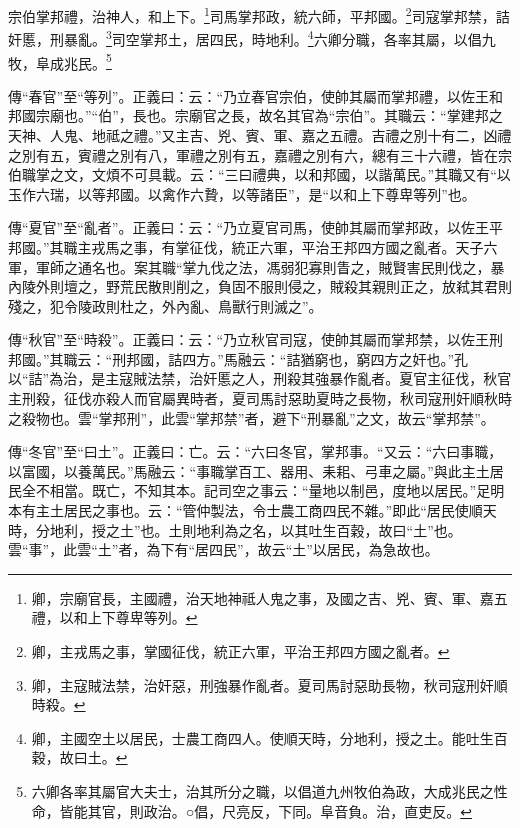 宗伯掌邦禮，治神人，和上下。\footnote{卿，宗廟官長，主國禮，治天地神祗人鬼之事，及國之吉、兇、賓、軍、嘉五禮，以和上下尊卑等列。}司馬掌邦政，統六師，平邦國。\footnote{卿，主戎馬之事，掌國征伐，統正六軍，平治王邦四方國之亂者。}司寇掌邦禁，詰奸慝，刑暴亂。\footnote{卿，主寇賊法禁，治奸惡，刑強暴作亂者。夏司馬討惡助長物，秋司寇刑奸順時殺。}司空掌邦土，居四民，時地利。\footnote{卿，主國空土以居民，士農工商四人。使順天時，分地利，授之土。能吐生百穀，故曰土。}六卿分職，各率其屬，以倡九牧，阜成兆民。\footnote{六卿各率其屬官大夫士，治其所分之職，以倡道九州牧伯為政，大成兆民之性命，皆能其官，則政治。○倡，尺亮反，下同。阜音負。治，直吏反。}

{\noindent\zhuan{}\fzbyks 傳“春官”至“等列”。正義曰：云：“乃立春官宗伯，使帥其屬而掌邦禮，以佐王和邦國宗廟也。”“伯”，長也。宗廟官之長，故名其官為“宗伯”。其職云：“掌建邦之天神、人鬼、地祗之禮。”又主吉、兇、賓、軍、嘉之五禮。吉禮之別十有二，凶禮之別有五，賓禮之別有八，軍禮之別有五，嘉禮之別有六，總有三十六禮，皆在宗伯職掌之文，文煩不可具載。云：“三曰禮典，以和邦國，以諧萬民。”其職又有“以玉作六瑞，以等邦國。以禽作六贄，以等諸臣”，是“以和上下尊卑等列”也。 \par}

{\noindent\zhuan{}\fzbyks 傳“夏官”至“亂者”。正義曰：云：“乃立夏官司馬，使帥其屬而掌邦政，以佐王平邦國。”其職主戎馬之事，有掌征伐，統正六軍，平治王邦四方國之亂者。天子六軍，軍師之通名也。案其職“掌九伐之法，馮弱犯寡則眚之，賊賢害民則伐之，暴內陵外則壇之，野荒民散則削之，負固不服則侵之，賊殺其親則正之，放弒其君則殘之，犯令陵政則杜之，外內亂、鳥獸行則滅之”。 \par}

{\noindent\zhuan{}\fzbyks 傳“秋官”至“時殺”。正義曰：云：“乃立秋官司寇，使帥其屬而掌邦禁，以佐王刑邦國。”其職云：“刑邦國，詰四方。”馬融云：“詰猶窮也，窮四方之奸也。”孔以“詰”為治，是主寇賊法禁，治奸慝之人，刑殺其強暴作亂者。夏官主征伐，秋官主刑殺，征伐亦殺人而官屬異時者，夏司馬討惡助夏時之長物，秋司寇刑奸順秋時之殺物也。雲“掌邦刑”，此雲“掌邦禁”者，避下“刑暴亂”之文，故云“掌邦禁”。 \par}

{\noindent\zhuan{}\fzbyks 傳“冬官”至“曰土”。正義曰：亡。云：“六曰冬官，掌邦事。“又云：“六曰事職，以富國，以養萬民。”馬融云：“事職掌百工、器用、耒耜、弓車之屬。”與此主土居民全不相當。既亡，不知其本。記司空之事云：“量地以制邑，度地以居民。”足明本有主土居民之事也。云：“管仲製法，令士農工商四民不雜。”即此“居民使順天時，分地利，授之土”也。土則地利為之名，以其吐生百穀，故曰“土”也。雲“事”，此雲“土”者，為下有“居四民”，故云“土”以居民，為急故也。 \par}

